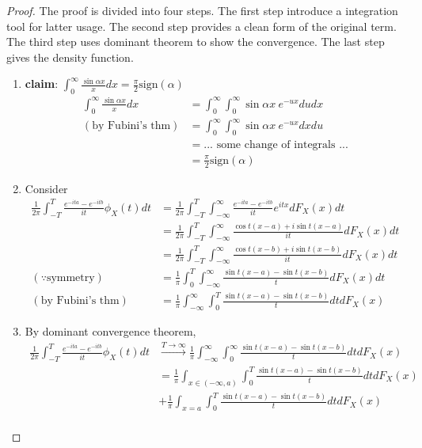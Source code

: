 \documentclass[../Transformation.tex]{subfiles}
\begin{document}
\begin{proof}
	The proof is divided into four steps. The first step introduce a integration tool for latter usage. The second step provides a clean form of the original term. The third step uses dominant theorem to show the convergence. The last step gives the density function.
	\begin{enumerate}
		\item {\bf claim}: $\int_0^{\infty}\frac{\sin\alpha x}{x}dx = \frac{\pi}{2}\mbox{sign}(\alpha)$\\
		\begin{align*}
		\int_0^{\infty}\frac{\sin\alpha x}{x}dx &= \int_0^{\infty}\int_0^{\infty}\sin\alpha x\ e^{-ux}dudx\\
		(\mbox{by Fubini's thm})&=\int_0^{\infty}\int_0^{\infty}\sin\alpha x\ e^{-ux}dxdu\\
		&= ...\mbox{ some change of integrals }...\\
		&=\frac{\pi}{2}\mbox{sign}(\alpha)
		\end{align*}
		\item Consider
		\begin{align*}
		\frac{1}{2\pi}\int_{-T}^{T}\frac{e^{-ita}-e^{-itb}}{it}\phi_X(t)dt &= \frac{1}{2\pi}\int_{-T}^{T}\int_{-\infty}^{\infty}\frac{e^{-ita}-e^{-itb}}{it}e^{itx}dF_X(x)dt\\
		&=\frac{1}{2\pi}\int_{-T}^{T}\int_{-\infty}^{\infty}\frac{\cos t(x-a)+i\sin t(x-a)}{it}dF_X(x)dt\\
		&=\frac{1}{2\pi}\int_{-T}^{T}\int_{-\infty}^{\infty}\frac{\cos t(x-b)+i\sin t(x-b)}{it}dF_X(x)dt\\
		(\because\mbox{symmetry})&=\frac{1}{\pi}\int_0^{T}\int_{-\infty}^{\infty}\frac{\sin t(x-a) - \sin t(x-b)}{t}dF_X(x)dt\\
		(\mbox{by Fubini's thm})&=\frac{1}{\pi}\int_{-\infty}^{\infty}\int_0^{T}\frac{\sin t(x-a) - \sin t(x-b)}{t}dtdF_X(x)
		\end{align*}
		\item By dominant convergence theorem,
		\begin{align*}
		\frac{1}{2\pi}\int_{-T}^{T}\frac{e^{-ita}-e^{-itb}}{it}\phi_X(t)dt &\xrightarrow{T\rightarrow\infty}\frac{1}{\pi}\int_{-\infty}^{\infty}\int_0^{\infty}\frac{\sin t(x-a) - \sin t(x-b)}{t}dtdF_X(x)\\
		&=\frac{1}{\pi}\int_{x\in(-\infty,a)}\int_0^{T}\frac{\sin t(x-a) - \sin t(x-b)}{t}dtdF_X(x)\\
		&+\frac{1}{\pi}\int_{x=a}\int_0^{T}\frac{\sin t(x-a) - \sin t(x-b)}{t}dtdF_X(x)\\

\end{align*}
\end{enumerate}
\end{proof}
\end{document}
